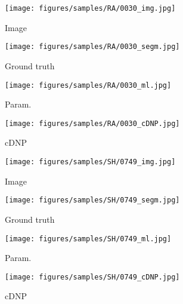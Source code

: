 \documentclass[10pt,twocolumn,letterpaper]{article}
\begin{document}
\begin{figure*}[h!]
    \begin{subfigure}[b]{0.11\textwidth}
        \centering
        \texttt{[image: figures/samples/RA/0030\_img.jpg]}
        \caption*{\scriptsize Image}
    \end{subfigure}
    \begin{subfigure}[b]{0.11\textwidth}
        \centering
        \texttt{[image: figures/samples/RA/0030\_segm.jpg]}
        \caption*{\scriptsize Ground truth}
    \end{subfigure}
    \begin{subfigure}[b]{0.11\textwidth}
        \centering
        \texttt{[image: figures/samples/RA/0030\_ml.jpg]}
        \caption*{\scriptsize Param.}
    \end{subfigure}
    \begin{subfigure}[b]{0.11\textwidth}
        \centering
        \texttt{[image: figures/samples/RA/0030\_cDNP.jpg]}
        \caption*{\scriptsize cDNP}
    \end{subfigure}
    \hspace{10px}
    \begin{subfigure}[b]{0.11\textwidth}
        \centering
        \texttt{[image: figures/samples/SH/0749\_img.jpg]}
        \caption*{\scriptsize Image}
    \end{subfigure}
    \begin{subfigure}[b]{0.11\textwidth}
        \centering
        \texttt{[image: figures/samples/SH/0749\_segm.jpg]}
        \caption*{\scriptsize Ground truth}
    \end{subfigure}
    \begin{subfigure}[b]{0.11\textwidth}
        \centering
        \texttt{[image: figures/samples/SH/0749\_ml.jpg]}
        \caption*{\scriptsize Param.}
    \end{subfigure}
    \begin{subfigure}[b]{0.11\textwidth}
        \centering
        \texttt{[image: figures/samples/SH/0749\_cDNP.jpg]}
        \caption*{\scriptsize cDNP}
    \end{subfigure}
    

\end{figure*}
\end{document}
